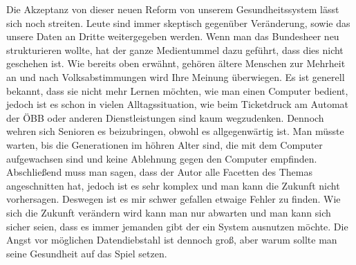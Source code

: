 \documentclass[journal]{IEEEtran}
\begin{document}
Die Akzeptanz von dieser neuen Reform von unserem Gesundheitssystem lässt sich noch streiten. Leute 
sind immer skeptisch gegenüber Veränderung, sowie das unsere Daten an Dritte weitergegeben werden. Wenn man das Bundesheer neu strukturieren \cite{bundesheer:reform} wollte, hat der ganze Medientummel dazu geführt, dass dies nicht geschehen ist. 
Wie bereits oben erwähnt, gehören ältere Menschen zur Mehrheit an und nach Volksabstimmungen wird Ihre Meinung überwiegen. Es ist generell bekannt, dass sie nicht mehr Lernen möchten, wie man einen Computer bedient, jedoch ist es schon in vielen Alltagssituation, wie beim Ticketdruck am Automat der ÖBB oder anderen Dienstleistungen \cite{welt:reform} sind kaum wegzudenken. 
Dennoch wehren sich Senioren es beizubringen, obwohl es allgegenwärtig ist. Man müsste warten, bis die Generationen im höhren Alter sind, die mit dem Computer aufgewachsen sind und keine Ablehnung gegen den Computer empfinden. \\



Abschließend muss man sagen, dass der Autor alle Facetten des Themas angeschnitten hat, jedoch ist es 
sehr komplex und man kann die Zukunft nicht vorhersagen. Deswegen ist es mir schwer gefallen etwaige Fehler zu finden. Wie sich die Zukunft verändern wird kann man nur abwarten und man kann sich sicher seien, dass es immer jemanden gibt der ein System ausnutzen möchte. Die Angst vor möglichen Datendiebstahl ist dennoch groß, aber warum sollte man seine Gesundheit auf das Spiel setzen. 





\appendices

\ifCLASSOPTIONcaptionsoff
 \newpage
\fi
\end{document}
